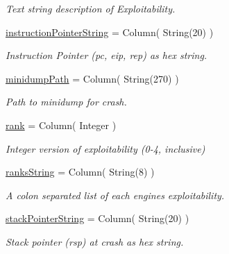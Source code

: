 \begin{DoxyCompactItemize}
\begin{DoxyCompactList}\small\item\em Text string description of Exploitability. \end{DoxyCompactList}\item 
\mbox{\label{classdb_1_1crash_1_1_crash_ae54ba9ca9022663917e61fa189c93eef}} 
\mbox{\hyperlink{classdb_1_1crash_1_1_crash_ae54ba9ca9022663917e61fa189c93eef}{instruction\+Pointer\+String}} = Column( String(20) )
\begin{DoxyCompactList}\small\item\em Instruction Pointer (pc, eip, rep) as hex string. \end{DoxyCompactList}\item 
\mbox{\label{classdb_1_1crash_1_1_crash_aa1dc18ccd51407f9546928f87a3dd8c3}} 
\mbox{\hyperlink{classdb_1_1crash_1_1_crash_aa1dc18ccd51407f9546928f87a3dd8c3}{minidump\+Path}} = Column( String(270) )
\begin{DoxyCompactList}\small\item\em Path to minidump for crash. \end{DoxyCompactList}\item 
\mbox{\label{classdb_1_1crash_1_1_crash_affab729f1100b51839050c3a463d9086}} 
\mbox{\hyperlink{classdb_1_1crash_1_1_crash_affab729f1100b51839050c3a463d9086}{rank}} = Column( Integer )
\begin{DoxyCompactList}\small\item\em Integer version of exploitability (0-\/4, inclusive) \end{DoxyCompactList}\item 
\mbox{\hyperlink{classdb_1_1crash_1_1_crash_ac2d5ddf37844b111c5e437b1fcbefbca}{ranks\+String}} = Column( String(8) )
\begin{DoxyCompactList}\small\item\em A colon separated list of each engines exploitability. \end{DoxyCompactList}\item 
\mbox{\label{classdb_1_1crash_1_1_crash_a83815729a71353269f438e268e6e52a8}} 
\mbox{\hyperlink{classdb_1_1crash_1_1_crash_a83815729a71353269f438e268e6e52a8}{stack\+Pointer\+String}} = Column( String(20) )
\begin{DoxyCompactList}\small\item\em Stack pointer (rsp) at crash as hex string. \end{DoxyCompactList}\item 

\end{DoxyCompactItemize}
